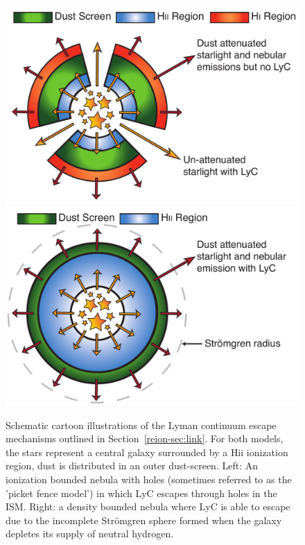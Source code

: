 \begin{landscape}
\begin{figure}
\centering
  \includegraphics[width=0.35\paperheight]{plots/Fig1a.pdf}
  \quad \quad \quad \quad \quad
  \includegraphics[width=0.35\paperheight]{plots/Fig1b.pdf}

  \caption[Schematic cartoon illustrations of the Lyman continuum escape mechanisms outlined in Section~\ref{reion-sec:link}]{Schematic cartoon illustrations of the Lyman continuum escape mechanisms outlined in Section~\ref{reion-sec:link}. For both models, the stars represent a central galaxy surrounded by a {\sc Hii} ionization region, dust is distributed in an outer dust-screen. Left: An ionization bounded nebula with holes (sometimes referred to as the 'picket fence model') in which LyC escapes through holes in the ISM. Right: a density bounded nebula where LyC is able to escape due to the incomplete Str{\"o}mgren sphere formed when the galaxy depletes its supply of neutral hydrogen.}
  \label{reion-fig:mechanisms}
\end{figure}
\end{landscape}

